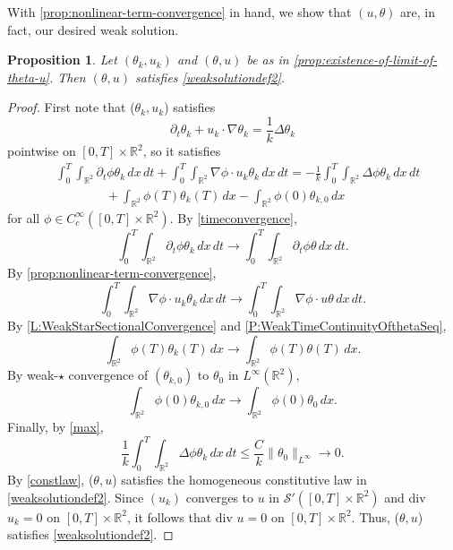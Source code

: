 \documentclass[11pt,reqno,xcolor=svgnames]{amsart}
\def\R{{\mathbb R}}
\theoremstyle{plain}
\newtheorem{prop}[theorem]{Proposition}
\theoremstyle{definition}
\theoremstyle{plain}
\theoremstyle{remark}
\begin{document}
With \cref{prop:nonlinear-term-convergence} in hand, we show that $(u, \theta)$ are, in fact, our desired weak solution.

\begin{prop}\label{prop:fourier-serfati-for-theta-u}
    Let $(\theta_k,u_k)$ and $(\theta,u)$ be as in \cref{prop:existence-of-limit-of-theta-u}.  Then $(\theta,u)$  satisfies \cref{weaksolutiondef2}.
\end{prop}
\begin{proof}
First note that ($\theta_k, u_k$) satisfies
$$\partial_t\theta_k + u_k\cdot\nabla \theta_k = \frac{1}{k} \Delta \theta_k$$
pointwise on $[0,T]\times\R^2$, so it satisfies
\begin{equation}
\begin{split}
&\int_{0}^T\int_{\R^2} \partial_t \phi \theta_k \, dx \, dt   +\int_{0}^T\int_{\R^2} \nabla \phi \cdot u_k\theta_k \, dx \, dt = -\frac{1}{k}\int_{0}^T\int_{\R^2} \Delta \phi \theta_k \, dx \, dt\\
&\qquad\qquad + \int_{\R^2}  \phi(T)\theta_{k}(T)\, dx-\int_{\R^2}  \phi(0)\theta_{k,0}\, dx
\end{split}
\end{equation}
for all $\phi\in C_c^{\infty}([0,T]\times \R^2)$.  By \cref{timeconvergence},
$$ \int_{0}^T\int_{\R^2} \partial_t \phi \theta_k \, dx \, dt \longrightarrow \int_{0}^T\int_{\R^2} \partial_t \phi \theta \, dx \, dt.  $$
By \cref{prop:nonlinear-term-convergence}, 
$$\int_{0}^T\int_{\R^2} \nabla \phi \cdot u_k\theta_k \, dx \, dt \longrightarrow \int_{0}^T\int_{\R^2} \nabla \phi \cdot u\theta \, dx \, dt. $$  
By \cref{L:WeakStarSectionalConvergence} and \cref{P:WeakTimeContinuityOfthetaSeq},
$$ \int_{\R^2}  \phi(T)\theta_{k}(T)\, dx \longrightarrow \int_{\R^2} \phi(T)\theta(T) \, dx.$$
By weak-$\star$ convergence of $(\theta_{k,0})$ to $\theta_0$ in $L^{\infty}(\R^2)$,
$$ \int_{\R^2}  \phi(0)\theta_{k,0}\, dx \longrightarrow \int_{\R^2} \phi(0) \theta_{0}\, dx.$$
Finally, by \cref{max}, 
$$\frac{1}{k}\int_{0}^T\int_{\R^2} \Delta \phi \theta_k \, dx \, dt \leq \frac{C}{k}\|\theta_0\|_{L^{\infty}} \longrightarrow 0.$$
By \cref{constlaw}, ($\theta,u$) satisfies the homogeneous constitutive law in \cref{weaksolutiondef2}.  Since $(u_k)$ converges to $u$ in $\mathcal{S'}([0,T]\times \R^2)$ and div $u_k=0$ on $[0,T]\times\R^2$, it follows that div $u=0$ on $[0,T]\times\R^2$.  Thus, ($\theta,u$) satisfies \cref{weaksolutiondef2}.
\end{proof}
\end{document}
